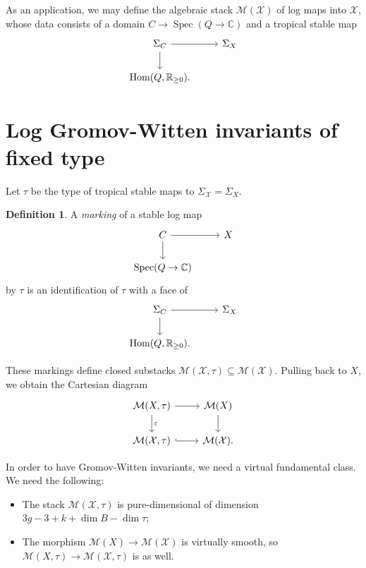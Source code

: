 \documentclass[leqno, openany]{memoir}
\theoremstyle{definition}
\newtheorem{defn}[thm]{Definition}
\theoremstyle{remark}
\theoremstyle{plain}
\theoremstyle{definition}
\theoremstyle{remark}
\newcommand{\R}{\mathbb{R}}
\newcommand{\C}{\mathbb{C}}
\newcommand{\ep}{\varepsilon}
\newcommand{\mc}[1]{\mathcal{#1}}
\DeclareMathOperator{\Hom}{Hom}
\DeclareMathOperator{\Spec}{Spec}
\begin{document}
As an application, we may define the algebraic stack $\mc{M}(\mc{X})$ of log maps into $\mc{X}$, whose data consists of a domain $C \to \Spec(Q \to \C)$ and a tropical stable map
\begin{equation*}
  \begin{tikzcd}
    \Sigma_C \ar{r} \ar{d} & \Sigma_X \\
    \Hom(Q, \R_{\geq 0}).
  \end{tikzcd}
\end{equation*}

\section{Log Gromov-Witten invariants of fixed type}
\label{sec:fixed_type}

Let $\tau$ be the type of tropical stable maps to $\Sigma_{\mc{X}} = \Sigma_X$.

\begin{defn}
  A \textit{marking} of a stable log map
  \begin{equation*}
    \begin{tikzcd}
      C \ar{r} \ar{d} & X \\
      \Spec(Q \to \C)
    \end{tikzcd}
  \end{equation*}
  by $\tau$ is an identification of $\tau$ with a face of
  \begin{equation*}
  \begin{tikzcd}
      \Sigma_C \ar{r} \ar{d} & \Sigma_X \\
      \Hom(Q, \R_{\geq 0}).
  \end{tikzcd}
  \end{equation*}
\end{defn}

These markings define closed substacks $\mc{M}(\mc{X}, \tau) \subseteq \mc{M}(\mc{X})$. Pulling back to $X$, we obtain the Cartesian diagram
\begin{equation*}
  \begin{tikzcd}
    \mc{M}(X, \tau) \ar{r} \ar{d}{\ep} & \mc{M}(X) \ar{d} \\
    \mc{M}(\mc{X}, \tau) \ar[hookrightarrow]{r} & \mc{M}(\mc{X}).
  \end{tikzcd}
\end{equation*}

In order to have Gromov-Witten invariants, we need a virtual fundamental class. We need the following:
\begin{itemize}
\item The stack $\mc{M}(\mc{X}, \tau)$ is pure-dimensional of dimension $3g-3+k+\dim B - \dim \tau$;
\item The morphism $\mc{M}(X) \to \mc{M}(\mc{X})$ is virtually smooth, so $\mc{M}(X, \tau) \to \mc{M}(\mc{X}, \tau)$ is as well.
\end{itemize}
\end{document}
